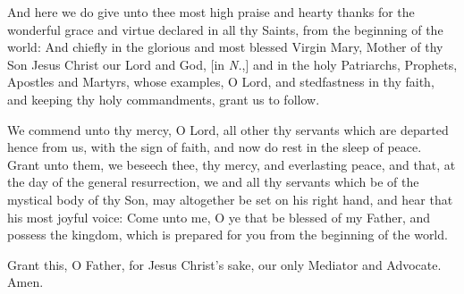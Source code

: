 




And here we do give unto thee most high praise and hearty thanks for the wonderful grace and virtue declared in all thy Saints, from the beginning of the world: And chiefly in the glorious and most blessed Virgin Mary, Mother of thy Son Jesus Christ our Lord and God, [in \emph{N.},] and in the holy Patriarchs, Prophets, Apostles and Martyrs, whose examples, O Lord, and stedfastness in thy faith, and keeping thy holy commandments, grant us to follow.

We commend unto thy mercy, O Lord, all other thy servants which are departed hence from us, with the sign of faith, and now do rest in the sleep of peace.  Grant unto them, we beseech thee, thy mercy, and everlasting peace, and that, at the day of the general resurrection, we and all thy servants which be of the mystical body of thy Son, may altogether be set on his right hand, and hear that his most joyful voice: Come unto me, O ye that be blessed of my Father, and possess the kingdom, which is prepared for you from the beginning of the world. 



Grant this, O Father, for Jesus Christ's sake, our only Mediator and Advocate. \R Amen.

